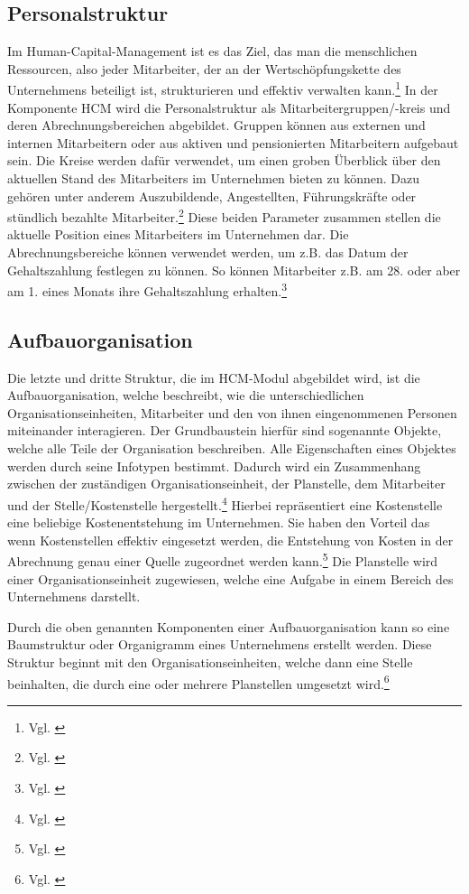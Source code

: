 \subsection{Personalstruktur}
Im Human-Capital-Management ist es das Ziel, das man die menschlichen Ressourcen, also jeder Mitarbeiter, der an der Wertschöpfungskette des Unternehmens beteiligt ist, strukturieren und effektiv verwalten kann.\footnote{Vgl. \cite{GablerWirtschaftslexikon2018}}
In der Komponente HCM wird die Personalstruktur als Mitarbeitergruppen/-kreis und deren Abrechnungsbereichen abgebildet.
Gruppen können aus externen und internen Mitarbeitern oder aus aktiven und pensionierten Mitarbeitern aufgebaut sein.
Die Kreise werden dafür verwendet, um einen groben Überblick über den aktuellen Stand des Mitarbeiters im Unternehmen bieten zu können.
Dazu gehören unter anderem Auszubildende, Angestellten, Führungskräfte oder stündlich bezahlte Mitarbeiter.\footnote{Vgl. \cite{SAPSE2024a}}
Diese beiden Parameter zusammen stellen die aktuelle Position eines Mitarbeiters im Unternehmen dar. 
Die Abrechnungsbereiche können verwendet werden, um z.B. das Datum der Gehaltszahlung festlegen zu können.
So können Mitarbeiter z.B. am 28. oder aber am 1. eines Monats ihre Gehaltszahlung erhalten.\footnote{Vgl. \cite{SAPSE2024a}}

\subsection{Aufbauorganisation}
Die letzte und dritte Struktur, die im HCM-Modul abgebildet wird, ist die Aufbauorganisation, welche beschreibt, wie die unterschiedlichen Organisationseinheiten, Mitarbeiter und den von ihnen eingenommenen Personen miteinander interagieren.
Der Grundbaustein hierfür sind sogenannte Objekte, welche alle Teile der Organisation beschreiben. Alle Eigenschaften eines Objektes werden durch seine Infotypen bestimmt.
Dadurch wird ein Zusammenhang zwischen der zuständigen Organisationseinheit, der Planstelle, dem Mitarbeiter und der Stelle/Kostenstelle hergestellt.\footnote{Vgl. \cite{SSSUM2019a}}
Hierbei repräsentiert eine Kostenstelle eine beliebige Kostenentstehung im Unternehmen.
Sie haben den Vorteil das wenn Kostenstellen effektiv eingesetzt werden, die Entstehung von Kosten in der Abrechnung genau einer Quelle zugeordnet werden kann.\footnote{Vgl. \cite{SAPSE2024b}}
Die Planstelle wird einer Organisationseinheit zugewiesen, welche eine Aufgabe in einem Bereich des Unternehmens darstellt.

Durch die oben genannten Komponenten einer Aufbauorganisation kann so eine Baumstruktur oder Organigramm eines Unternehmens erstellt werden.
Diese Struktur beginnt mit den Organisationseinheiten, welche dann eine Stelle beinhalten, die durch eine oder mehrere Planstellen umgesetzt wird.\footnote{Vgl. \cite{SAPSE2024c}}

